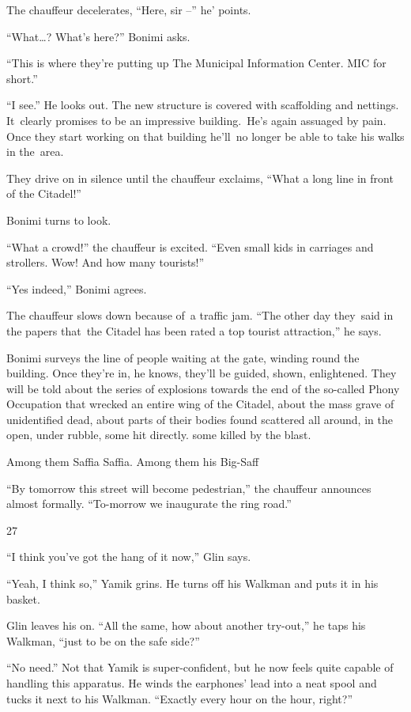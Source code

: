 \documentclass[twoside,11pt]{book}
\begin{document}
The chauffeur decelerates, ``Here, sir --'' he{}' points.

``What{\dots}? What's here?'' Bonimi asks. 

``This is where they're putting up The Municipal Information Center. MIC for short.'' 

``I see.'' He looks out. The new structure is covered with scaffolding and nettings.
It{\ }clearly promises to be an impressive building.\ He{}'s again assuaged by pain. Once they start
working on that building he'll\ no longer be able to take his walks in the\ area. 

They drive on in silence until the chauffeur exclaims, ``What a long line in front of the
Citadel!''

Bonimi turns to look. 

``What a crowd!'' the chauffeur is excited. ``Even small kids in carriages and
strollers. Wow! And how many tourists!''

``Yes indeed,'' Bonimi agrees. 

The chauffeur slows down because of\ a traffic jam. ``The other day they\ said in the papers that\ the
Citadel has been rated a top tourist attraction,'' he says.

Bonimi surveys the line of people waiting at the gate, winding round the building. Once they're in, he knows, they'll be
guided, shown, enlightened. They will be told about the series of explosions towards the end of the so-called Phony
Occupation that wrecked an entire wing of the Citadel, about the mass grave of unidentified dead, about parts of their
bodies found scattered all around, in the open, under rubble, some hit directly. some killed by the blast.

Among them Saffia Saffia. Among them his Big-Saff

``By tomorrow this street will become pedestrian,'' the chauffeur announces almost formally.
``To-morrow we inaugurate the ring road.'' 


\bigskip

27 

``I think you've got the hang of it now,'' Glin says.

``Yeah, I think so,'' Yamik grins. He turns off his Walkman and puts it in his basket.

Glin leaves his on. ``All the same, how about another try-out,'' he taps his Walkman, ``just
to be on the safe side?'' 

``No need.'' Not that Yamik is super-confident, but he now feels quite capable of handling
this apparatus. He winds the earphones' lead into a neat spool and tucks it next to his Walkman. ``Exactly
every hour on the hour, right?'' 
\end{document}
